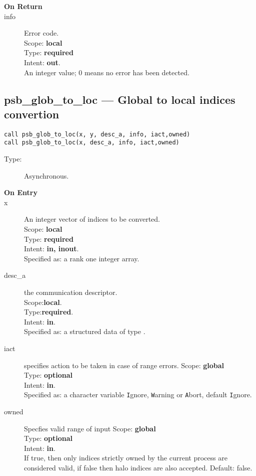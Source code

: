 \begin{description}
\item[\bf On Return]
\item[info] Error code.\\
Scope: {\bf local} \\
Type: {\bf required} \\
Intent: {\bf out}.\\
An integer value; 0 means no error has been detected. 
\end{description}


%
%
\clearpage\subsection*{psb\_glob\_to\_loc --- Global to local indices
  convertion}

\begin{verbatim}
call psb_glob_to_loc(x, y, desc_a, info, iact,owned)
call psb_glob_to_loc(x, desc_a, info, iact,owned)
\end{verbatim}

\begin{description}
\item[Type:] Asynchronous.
\item[\bf On Entry]
\item[x] An integer vector of indices to be converted.\\
Scope: {\bf local} \\
Type: {\bf required}\\
Intent: {\bf in, inout}.\\
Specified as: a rank one integer array.\\
\item[desc\_a] the communication descriptor.\\
Scope:{\bf local}.\\
Type:{\bf required}.\\
Intent: {\bf in}.\\
Specified as: a structured data of type \descdata.
\item[iact] specifies action to be taken in case of range errors. 
Scope: {\bf global} \\
Type: {\bf optional}\\
Intent: {\bf in}.\\
Specified as: a character variable  \verb|I|gnore, \verb|W|arning or
\verb|A|bort, default \verb|I|gnore.
\item[owned] Specfies valid range of input 
Scope: {\bf global} \\
Type: {\bf optional}\\
Intent: {\bf in}.\\
If true, then only indices strictly owned by the current process are
considered valid, if false then halo indices are also
accepted. Default: false. 
\end{description}

